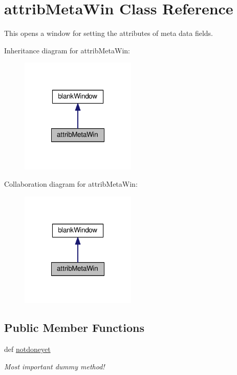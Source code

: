 \hypertarget{classgui_1_1window3a_1_1attribMetaWin}{\section{attrib\-Meta\-Win Class Reference}
\label{classgui_1_1window3a_1_1attribMetaWin}
}


This opens a window for setting the attributes of meta data fields.  




Inheritance diagram for attrib\-Meta\-Win\-:\nopagebreak
\begin{figure}[H]
\begin{center}
\leavevmode
\includegraphics[width=156pt]{classgui_1_1window3a_1_1attribMetaWin__inherit__graph}
\end{center}
\end{figure}


Collaboration diagram for attrib\-Meta\-Win\-:\nopagebreak
\begin{figure}[H]
\begin{center}
\leavevmode
\includegraphics[width=156pt]{classgui_1_1window3a_1_1attribMetaWin__coll__graph}
\end{center}
\end{figure}
\subsection*{Public Member Functions}
\begin{DoxyCompactItemize}
\item 
\hypertarget{classgui_1_1window3a_1_1attribMetaWin_a615f3073891733337c33f599f89ec7ef}{def \hyperlink{classgui_1_1window3a_1_1attribMetaWin_a615f3073891733337c33f599f89ec7ef}{notdoneyet}}\label{classgui_1_1window3a_1_1attribMetaWin_a615f3073891733337c33f599f89ec7ef}

\begin{DoxyCompactList}\small\item\em Most important dummy method! \end{DoxyCompactList}\end{DoxyCompactItemize}


